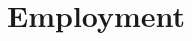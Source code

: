 \documentclass[a4paper, nocolor]{moderncv}
\begin{document}
\maketitle

\section{Employment}

\end{document}
